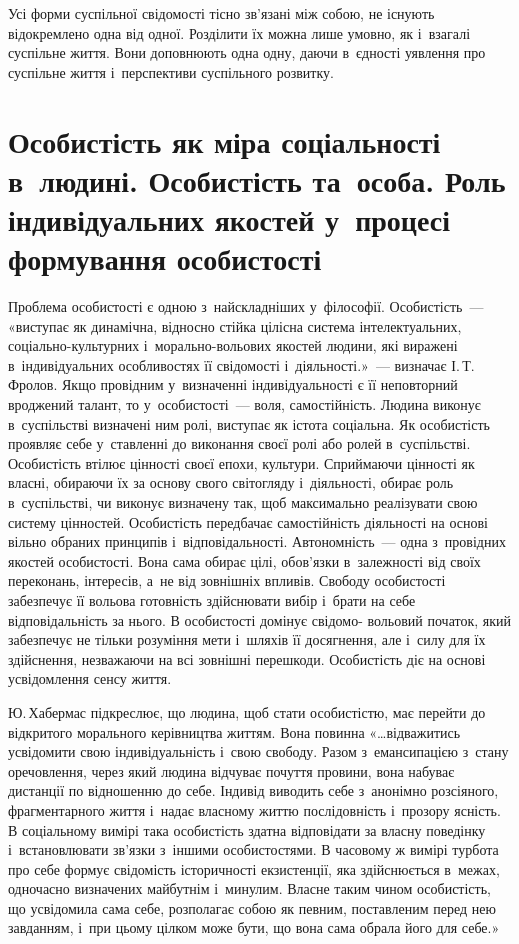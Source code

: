 \documentclass[a5paper,oneside,DIV=12,12pt,headings=small]{scrartcl}
\begin{document}
		Усі форми суспільної свідомості тісно зв'язані між собою, не існують відокремлено одна від одної.  Розділити їх можна лише умовно, як і~взагалі суспільне життя. Вони доповнюють одна одну, даючи в~єдності уявлення про суспільне життя і~перспективи суспільного розвитку.
		
	\section{Особистість як міра соціальності в~людині. Особистість та~особа. Роль індивідуальних якостей у~процесі формування особистості}
		Проблема особистості є одною з~найскладніших у~філософії. Особистість~— «виступає як  динамічна, відносно стійка цілісна система інтелектуальних, соціально-культурних і~морально-вольових якостей людини, які виражені в~індивідуальних особливостях її свідомості і~діяльності.»~— визначає  І.\,Т.\,Фролов. Якщо провідним у~визначенні індивідуальності є її  неповторний вроджений талант, то у~особистості~— воля, самостійність. Людина виконує в~суспільстві визначені ним ролі, виступає як істота соціальна. Як особистість проявляє себе  у~ставленні до виконання своєї ролі або ролей в~суспільстві. Особистість втілює цінності своєї епохи, культури. Сприймаючи цінності  як власні, обираючи їх за основу свого світогляду і~діяльності, обирає роль в~суспільстві, чи виконує визначену так, щоб максимально реалізувати свою систему цінностей.  Особистість передбачає  самостійність діяльності на основі вільно обраних принципів і~відповідальності. Автономність~— одна з~провідних якостей особистості. Вона сама обирає цілі, обов'язки в~залежності від своїх переконань, інтересів, а~не від зовнішніх впливів. Свободу особистості забезпечує її  вольова готовність  здійснювати вибір і~брати на себе відповідальність за нього. В особистості домінує свідомо- вольовий початок, який забезпечує не тільки розуміння мети і~шляхів її досягнення, але і~силу для їх здійснення, незважаючи на всі  зовнішні перешкоди. Особистість діє на основі  усвідомлення сенсу життя. 
		
		Ю.\,Хабермас підкреслює, що людина, щоб стати особистістю, має перейти до відкритого морального керівництва життям. Вона повинна «…відважитись усвідомити свою індивідуальність і~свою свободу. Разом з~емансипацією з~стану оречовлення, через який людина відчуває почуття провини, вона набуває дистанції по відношенню до себе. Індивід виводить себе з~анонімно розсіяного, фрагментарного життя і~надає власному життю послідовність і~прозору ясність. В соціальному вимірі така особистість здатна відповідати за власну поведінку і~встановлювати зв'язки з~іншими особистостями. В часовому ж вимірі турбота про себе формує свідомість історичності екзистенції, яка здійснюється в~межах, одночасно визначених майбутнім і~минулим. Власне таким чином особистість, що усвідомила сама себе, розполагає собою як певним, поставленим перед нею завданням, і~при цьому цілком може бути, що вона сама обрала його для себе.» 
		
\end{document}
